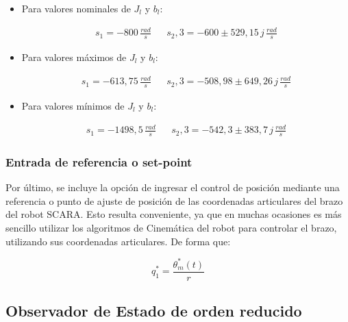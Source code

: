 \documentclass{article}
\begin{document}
\begin{itemize}
    \item Para valores nominales de $J_l$ y $b_l$:
    
    \begin{align*}
        s_1 = -800\, \frac{rad}{s} & & s_2,3  = -600 \pm 529,15\, j \, \frac{rad}{s} 
    \end{align*}
    
    \item Para valores máximos de $J_l$ y $b_l$:
    
    \begin{align*}
        s_1 = -613,75\, \frac{rad}{s} & & s_2,3  = -508,98 \pm 649,26\, j \, \frac{rad}{s} 
    \end{align*}

    \item Para valores mínimos de $J_l$ y $b_l$:
    
    \begin{align*}
        s_1 = -1498,5\, \frac{rad}{s} & & s_2,3  = -542,3 \pm 383,7\, j \, \frac{rad}{s} 
    \end{align*}

\end{itemize}



\subsubsection{Entrada de referencia o set-point}

Por último, se incluye la opción de ingresar el control de posición mediante una referencia o punto de 
ajuste de posición de las coordenadas articulares del brazo del robot SCARA. Esto resulta conveniente, ya que 
en muchas ocasiones es más sencillo utilizar los algoritmos de Cinemática del robot para controlar 
el brazo, utilizando sus coordenadas articulares. De forma que:

\begin{equation}
    q_1^* = \frac{\theta_m^*(t)}{r}
\end{equation}



\subsection{Observador de Estado de orden reducido}
\end{document}

